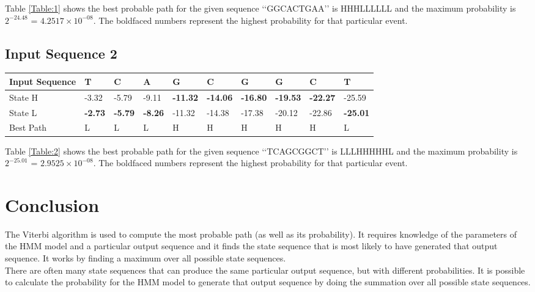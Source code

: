 \documentclass[12pt]{article}
\begin{document}
Table \ref{Table:1} shows the best probable path for the given sequence \lq\lq{GGCACTGAA}\rq\rq{} is HHHLLLLLL and the maximum probability is $2^{-24.48}$ = $4.2517\times10^{-08}$. The boldfaced numbers represent the highest probability for that particular event.

\subsection{Input Sequence 2} 

\begin{center}
\begin{tabular}{ | m{5em} | m{3em} | m{3em} | m{3em} | m{3em} | m{3em} | m{3em} | m{3em} | m{3em} | m{3em} | }
 \hline
 Input Sequence & T & C & A & G & C & G & G & C & T \\
 \hline
 State H & -3.32 & -5.79 & -9.11 & \textbf{-11.32} & \textbf{-14.06} & \textbf{-16.80} & \textbf{-19.53} & \textbf{-22.27} & -25.59  \\
 \hline
 State L & \textbf{-2.73} & \textbf{-5.79} & \textbf{-8.26} & -11.32 & -14.38 & -17.38 & -20.12 & -22.86 & \textbf{-25.01} \\
 \hline
 Best Path & L & L & L & H & H & H & H & H & L \\
 \hline
\end{tabular}
\label{Table:2}
\end{center}

Table \ref{Table:2} shows the best probable path for the given sequence \lq\lq{TCAGCGGCT}\rq\rq{} is LLLHHHHHL and the maximum probability is $2^{-25.01}$ = $2.9525\times10^{-08}$. The boldfaced numbers represent the highest probability for that particular event. 

\section{Conclusion}
The Viterbi algorithm is used to compute the most probable path (as well as its probability). It requires knowledge of the parameters of the HMM model and a particular output sequence and it finds the state sequence that is most likely to have generated that output sequence. It works by finding a maximum over all possible state sequences. \\

There are often many state sequences that can produce the same particular output sequence, but with different probabilities. It is possible to calculate the probability for the HMM model to generate that output sequence by doing the summation over all possible state sequences. \\
\end{document}
